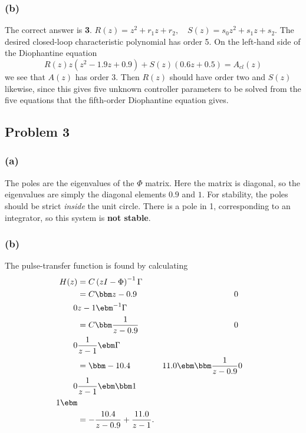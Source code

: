 \documentclass{scrartcl}
\begin{document}
\subsubsection*{(b)}
\label{sec:orgheadline15}
The correct answer is \textbf{3}.  \(R(z) = z^2 + r_1z + r_2, \quad S(z) = s_0z^2 + s_1z + s_2\). The desired closed-loop characteristic polynomial has order 5. On the left-hand side of the Diophantine equation 
\[ R(z) z \left(z^{2} - 1.9 z + 0.9\right) + S(z) \left(0.6 z + 0.5\right) = A_{cl}(z) \]
we see that \(A(z)\) has order 3. Then \(R(z)\) should have order two and \(S(z)\) likewise, since this gives five unknown controller parameters to be solved from the five equations that the fifth-order Diophantine equation gives. 

\subsection*{Problem 3}
\label{sec:orgheadline20}
\subsubsection*{(a)}
\label{sec:orgheadline17}
The poles are the eigenvalues of the \(\Phi\) matrix. Here the matrix is diagonal, so the eigenvalues are simply the diagonal elements \(0.9\) and \(1\). For stability, the poles should be strict \emph{inside} the unit circle. There is a pole in 1, corresponding to an integrator, so this system is \textbf{not stable}.

\subsubsection*{(b)}
\label{sec:orgheadline18}
The pulse-transfer function is found by calculating
\begin{equation*}
  \begin{split}
 H(z) &= C \left( zI - \Phi\right)^{-1} \Gamma\\
      &= C \bbm z-0.9 & 0\\0 & z-1 \ebm ^{-1} \Gamma \\
      &= C \bbm \frac{1}{z-0.9} & 0\\ 0 & \frac{1}{z-1} \ebm \Gamma \\
      &= \bbm -10.4 & 11.0 \ebm \bbm \frac{1}{z-0.9} & 0\\ 0 & \frac{1}{z-1} \ebm \bbm 1\\1\ebm \\
      &= - \frac{10.4}{z-0.9} + \frac{11.0}{z-1}.
  \end{split}
 \end{equation*}
\end{document}
